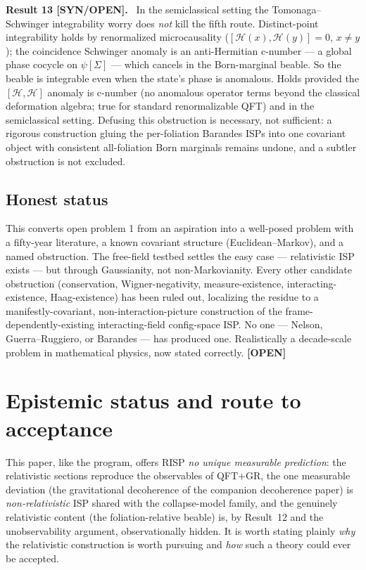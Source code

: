 \documentclass[aps,prd,preprint,amsmath,amssymb,nofootinbib,superscriptaddress]{revtex4-2}
\newenvironment{result}[1]{\par\medskip\noindent\textbf{#1}\ }{\par\medskip}
\begin{document}
\begin{result}{Result 13 [SYN/OPEN].}
In the semiclassical setting the Tomonaga--Schwinger integrability worry does \emph{not} kill the
fifth route. Distinct-point integrability holds by renormalized microcausality
($[\mathcal H(x),\mathcal H(y)]=0$, $x\neq y$); the coincidence Schwinger anomaly is an
anti-Hermitian c-number --- a global phase cocycle on $\psi[\Sigma]$ --- which cancels in the
Born-marginal beable. So the beable is integrable even when the state's phase is anomalous.
Holds provided the $[\mathcal H,\mathcal H]$ anomaly is c-number (no anomalous operator terms
beyond the classical deformation algebra; true for standard renormalizable QFT) and in the
semiclassical setting. Defusing this obstruction is necessary, not sufficient: a rigorous
construction gluing the per-foliation Barandes ISPs into one covariant object with consistent
all-foliation Born marginals remains undone, and a subtler obstruction is not excluded.
\end{result}

\subsection{Honest status}
This converts open problem 1 from an aspiration into a well-posed problem with a fifty-year
literature, a known covariant structure (Euclidean--Markov), and a named obstruction. The
free-field testbed settles the easy case --- relativistic ISP exists --- but through
Gaussianity, not non-Markovianity. Every other candidate obstruction (conservation,
Wigner-negativity, measure-existence, interacting-existence, Haag-existence) has been ruled out,
localizing the residue to a manifestly-covariant, non-interaction-picture construction of the
frame-dependently-existing interacting-field config-space ISP. No one --- Nelson,
Guerra--Ruggiero, or Barandes --- has produced one. Realistically a decade-scale problem in
mathematical physics, now stated correctly. \textbf{[OPEN]}

\section{Epistemic status and route to acceptance}

This paper, like the program, offers RISP \emph{no unique measurable prediction}: the relativistic
sections reproduce the observables of QFT$+$GR, the one measurable deviation (the gravitational
decoherence of the companion decoherence paper) is \emph{non-relativistic} ISP shared with the
collapse-model family, and the genuinely relativistic content (the foliation-relative beable) is, by
Result~12 and the unobservability argument, observationally hidden. It is worth stating plainly
\emph{why} the relativistic construction is worth pursuing and \emph{how} such a theory could ever be
accepted.
\end{document}
